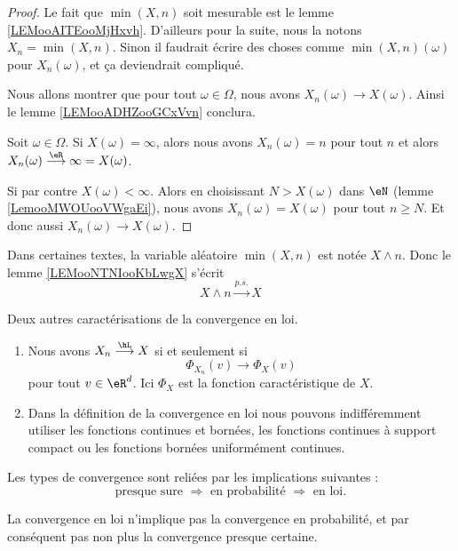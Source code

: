 \begin{proof}
    Le fait que \( \min(X,n)\) soit mesurable est le lemme \ref{LEMooAITEooMjHxvh}. D'ailleurs pour la suite, nous la notons \( X_n=\min(X,n)\). Sinon il faudrait écrire des choses comme \( \min(X,n)(\omega)\) pour \( X_n(\omega)\), et ça deviendrait compliqué.

    Nous allons montrer que pour tout \( \omega\in \Omega\), nous avons \( X_n(\omega)\to X(\omega)\). Ainsi le lemme \ref{LEMooADHZooGCxVvn} conclura.

    Soit \( \omega\in\Omega\). Si \( X(\omega)=\infty\), alors nous avons \( X_n(\omega)=n\) pour tout \( n\) et alors \( X_n(\omega)\stackrel{\eR}{\longrightarrow}\infty=X(\omega)\).

    Si par contre \( X(\omega)<\infty\). Alors en choisissant \( N>X(\omega)\) dans \( \eN\) (lemme \ref{LemooMWOUooVWgaEi}), nous avons \( X_n(\omega)=X(\omega)\) pour tout \( n\geq N\). Et donc aussi \( X_n(\omega)\to X(\omega)\).
\end{proof}

\begin{normaltext}
    Dans certaines textes, la variable aléatoire \( \min(X,n)\) est notée \( X\wedge n\). Donc le lemme \ref{LEMooNTNIooKbLwgX} s'écrit
    \begin{equation}
        X\wedge n\stackrel{p.s.}{\longrightarrow}X
    \end{equation}
\end{normaltext}

\begin{proposition}     \label{PrpopCaractCvL}
	Deux autres caractérisations de la convergence en loi.
	\begin{enumerate}
		\item
		      Nous avons \( X_n\stackrel{\hL}{\longrightarrow}X\) si et seulement si
		      \begin{equation}
			      \Phi_{X_n}(v)\to\Phi_X(v)
		      \end{equation}
		      pour tout \( v\in\eR^d\). Ici \( \Phi_X\) est la fonction caractéristique de \( X\).
		\item
		      Dans la définition de la convergence en loi nous pouvons indifféremment utiliser les fonctions continues et bornées, les fonctions continues à support compact ou les fonctions bornées uniformément continues.
	\end{enumerate}
\end{proposition}

\begin{proposition} \label{PropJFVJDuX}
	Les types de convergence sont reliées par les implications suivantes :
	\begin{equation}
		\text{presque sure }\Rightarrow\text{ en probabilité }\Rightarrow\text{ en loi}.
	\end{equation}
\end{proposition}
La convergence en loi n'implique pas la convergence en probabilité, et par conséquent pas non plus la convergence presque certaine.


